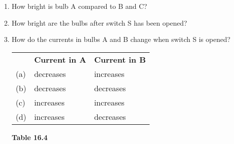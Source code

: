 \begin{enumerate}[noitemsep, label=\textbf{\arabic*}. ]
\begin{figure}[H]
\begin{center}
      \vspace{2pt}
    \vspace{.1in}
    \end{center}
 \end{figure}       \label{m38776*id68549}\begin{enumerate}[noitemsep, label=\textbf{\alph*}. ] 
            \label{m38776*uid101}\item How bright is bulb A compared to B and C?
\label{m38776*uid102}\item How bright are the bulbs after switch S has been opened?
\label{m38776*uid103}\item How do the currents in bulbs A and B change when switch S is opened?
          \begin{table}[H]
        \begin{center}
      \label{m38776*id68590}
    \noindent
      \tablelasttail{}
      \begin{xtabular}[t]{|l|l|l|}\hline
         &
        \textbf{Current in A} &
        \textbf{Current in B}%
     \tabularnewline{}
        (a) &
        decreases &
        increases%
     \tabularnewline{}
        (b) &
        decreases &
        decreases%
     \tabularnewline{}
        (c) &
        increases &
        increases%
     \tabularnewline{}
        (d) &
        increases &
        decreases%
     \tabularnewline{}
    \end{xtabular}
      \end{center}
    \begin{center}{\small\bfseries Table 16.4}\end{center}

\end{table}
\end{enumerate}
\end{enumerate}
